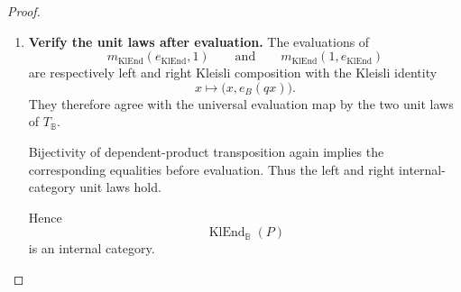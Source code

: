 \begin{proof}
\begin{enumerate}
        Under dependent-product transposition, their evaluations are the two
        parenthesizations of the Kleisli composite of three operations. These
        evaluated maps are equal by associativity of Kleisli composition,
        equivalently by associativity of the multiplication of
        \(T_{\mathbb B}\).

        Dependent-product transposition is a bijection of hom-sets.
        Therefore equality of the evaluated transposes implies equality of
        the original maps. Hence \(m_{\operatorname{KlEnd}}\) is associative.

        \item \textbf{Verify the unit laws after evaluation.}
        The evaluations of
        \[
            m_{\operatorname{KlEnd}}
            (e_{\operatorname{KlEnd}},1)
            \qquad\text{and}\qquad
            m_{\operatorname{KlEnd}}
            (1,e_{\operatorname{KlEnd}})
        \]
        are respectively left and right Kleisli composition with the
        Kleisli identity
        \[
            x\longmapsto
            \bigl(
                x,e_B(qx)
            \bigr).
        \]
        They therefore agree with the universal evaluation map by the two
        unit laws of \(T_{\mathbb B}\).

        Bijectivity of dependent-product transposition again implies the
        corresponding equalities before evaluation. Thus the left and right
        internal-category unit laws hold.

        Hence
        \[
            \operatorname{KlEnd}_{\mathbb B}(P)
        \]
        is an internal category.
    \end{enumerate}
\end{proof}

